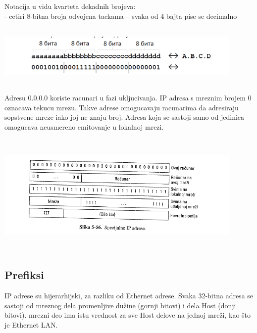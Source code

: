 \documentclass{article} %
\begin{document}
Notacija u vidu kvarteta dekadnih brojeva:\\
 - cetiri 8-bitna broja odvojena tackama – svaka od 4 bajta pise se decimalno 
 \begin{center}
\includegraphics[width=12cm, height=3cm]{IPadresa}\\
\end{center}
Adresu 0.0.0.0 koriste racunari u fazi ukljucivanja. IP adresa s mreznim brojem 0 oznacava tekucu mrezu. Takve adrese omogucavaju racunarima da adresiraju sopstvene mreze iako joj ne znaju broj. Adresa koja se sastoji samo od jedinica omogucava neusmereno emitovanje u lokalnoj mrezi.
 \begin{center}
\includegraphics[width=12cm, height=6cm]{specijalneIP}\\
\end{center}

\subsection{Prefiksi}
IP adrese su hijerarhijski, za razliku od Ethernet adrese. Svaka 32-bitna adresa
se sastoji od mreznog dela promenljive dužine (gornji bitovi) i dela Host
(donji bitovi). mrezni deo ima istu vrednost za sve Host delove na jednoj
mreži, kao što je Ethernet LAN. \\
\end{document}
